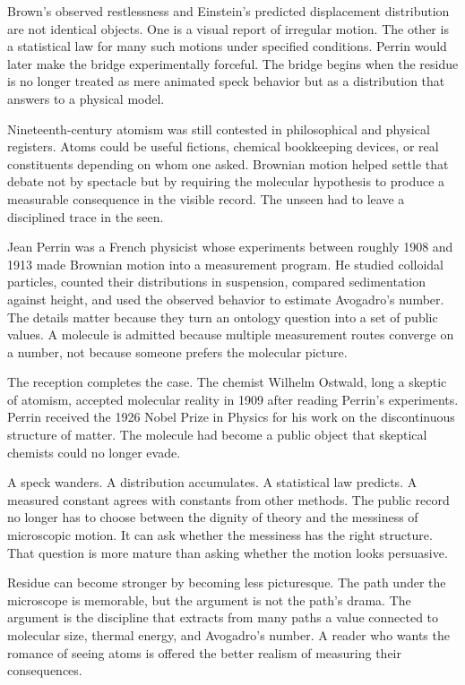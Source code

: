 Brown's observed restlessness and Einstein's predicted displacement
distribution are not identical objects. One is a visual report of
irregular motion. The other is a statistical law for many such motions
under specified conditions. Perrin would later make the bridge
experimentally forceful. The bridge begins when the residue is no longer
treated as mere animated speck behavior but as a distribution that
answers to a physical model.

Nineteenth-century atomism was still contested in philosophical and
physical registers. Atoms could be useful fictions, chemical bookkeeping
devices, or real constituents depending on whom one asked. Brownian
motion helped settle that debate not by spectacle but by requiring the
molecular hypothesis to produce a measurable consequence in the visible
record. The unseen had to leave a disciplined trace in the seen.

Jean Perrin was a French physicist whose experiments between roughly
1908 and 1913 made Brownian motion into a measurement program. He
studied colloidal particles, counted their distributions in suspension,
compared sedimentation against height, and used the observed behavior to
estimate Avogadro's number. The details matter because they turn an
ontology question into a set of public values. A molecule is admitted
because multiple measurement routes converge on a number, not because
someone prefers the molecular picture.

The reception completes the case. The chemist Wilhelm Ostwald, long a
skeptic of atomism, accepted molecular reality in 1909 after reading
Perrin's experiments. Perrin received the 1926 Nobel Prize in Physics
for his work on the discontinuous structure of matter. The molecule had
become a public object that skeptical chemists could no longer evade.

A speck wanders. A distribution accumulates. A statistical law predicts.
A measured constant agrees with constants from other methods. The public
record no longer has to choose between the dignity of theory and the
messiness of microscopic motion. It can ask whether the messiness has the
right structure. That question is more mature than asking whether the
motion looks persuasive.

Residue can become stronger by becoming less picturesque. The path under
the microscope is memorable, but the argument is not the path's drama.
The argument is the discipline that extracts from many paths a value
connected to molecular size, thermal energy, and Avogadro's number. A
reader who wants the romance of seeing atoms is offered the better
realism of measuring their consequences.

